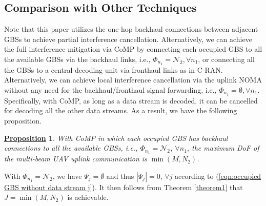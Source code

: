 \documentclass[onecolumn, draftclsnofoot, 12pt]{IEEEtran}
\newtheorem{proposition}{\underline{Proposition}}
\begin{document}
\subsection{Comparison with Other Techniques}

Note that this paper utilizes the one-hop backhaul connections between adjacent GBSs to achieve partial interference cancellation. Alternatively, we can achieve the full interference mitigation via CoMP by connecting each occupied GBS to all the available GBSs via the backhaul links, i.e., $\Phi_{n_1}\!=\!\mathcal{N}_2,\forall n_1$, or connecting all the GBSs to a central decoding unit via fronthaul links as in C-RAN. Alternatively, we can achieve local interference cancellation via the uplink NOMA without any need for the backhaul/fronthaul signal forwarding, i.e., $\Phi_{n_1}\!=\!\emptyset,\forall n_1$. Specifically, with CoMP, as long as a data stream is decoded, it can be cancelled for decoding all the other data streams. As a result, we have the following proposition.
\begin{proposition}\label{proposition1}
With CoMP in which each occupied GBS has backhaul connections to all the available GBSs, i.e., $\Phi_{n_1}=\mathcal{N}_2$, $\forall n_1$, the maximum DoF of the multi-beam UAV uplink communication is $\min(M,N_2)$.
\end{proposition}
\begin{IEEEproof}
With $\Phi_{n_1}=\mathcal{N}_2$, we have $\Psi_j=\emptyset$ and thus $|\Psi_j|=0$, $\forall j$ according to (\ref{eqn:occupied GBS without data stream j}). It then follows from Theorem \ref{theorem1} that $J=\min(M,N_2)$ is achievable.
\end{IEEEproof}
\end{document}
